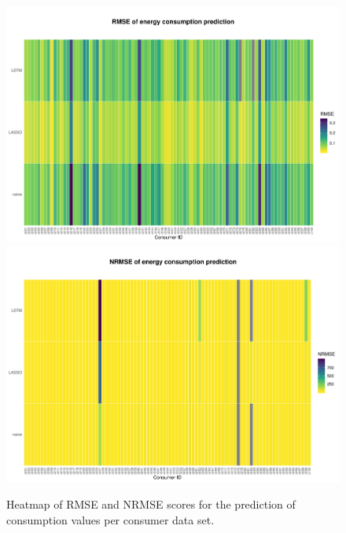 \begin{figure}[htbp]
 \centering
 \includegraphics[width=\textwidth]{thesis/graphs/evaluation/c_heatmap_RMSE.pdf}
 \includegraphics[width=\textwidth]{thesis/graphs/evaluation/c_heatmap_NRMSE.pdf}
\caption[Heatmap of RMSE and NRMSE scores for consumption values]{Heatmap of RMSE and NRMSE scores for the prediction of consumption values per consumer data set. \quantnet\href{ }{}}
\label{Fig:heatmapNRMSE}
\end{figure}
%



